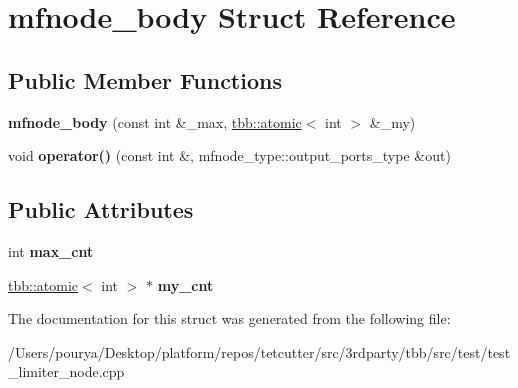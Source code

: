 \hypertarget{structmfnode__body}{}\section{mfnode\+\_\+body Struct Reference}
\label{structmfnode__body}
\subsection*{Public Member Functions}
\begin{DoxyCompactItemize}
\item 
\hypertarget{structmfnode__body_af6fb4786fb8e2320289511eca64439e3}{}{\bfseries mfnode\+\_\+body} (const int \&\+\_\+max, \hyperlink{structtbb_1_1atomic}{tbb\+::atomic}$<$ int $>$ \&\+\_\+my)\label{structmfnode__body_af6fb4786fb8e2320289511eca64439e3}

\item 
\hypertarget{structmfnode__body_a902ebfc6d191d92451809508bd73e7f3}{}void {\bfseries operator()} (const int \&, mfnode\+\_\+type\+::output\+\_\+ports\+\_\+type \&out)\label{structmfnode__body_a902ebfc6d191d92451809508bd73e7f3}

\end{DoxyCompactItemize}
\subsection*{Public Attributes}
\begin{DoxyCompactItemize}
\item 
\hypertarget{structmfnode__body_aab5d6e81612cba5c4814d227a806ad9d}{}int {\bfseries max\+\_\+cnt}\label{structmfnode__body_aab5d6e81612cba5c4814d227a806ad9d}

\item 
\hypertarget{structmfnode__body_abaae2437078cbcc0eb4a80e930ca524d}{}\hyperlink{structtbb_1_1atomic}{tbb\+::atomic}$<$ int $>$ $\ast$ {\bfseries my\+\_\+cnt}\label{structmfnode__body_abaae2437078cbcc0eb4a80e930ca524d}

\end{DoxyCompactItemize}


The documentation for this struct was generated from the following file\+:\begin{DoxyCompactItemize}
\item 
/\+Users/pourya/\+Desktop/platform/repos/tetcutter/src/3rdparty/tbb/src/test/test\+\_\+limiter\+\_\+node.\+cpp\end{DoxyCompactItemize}
